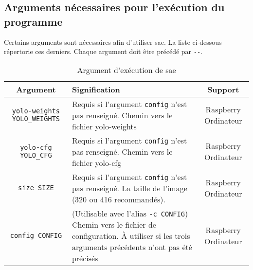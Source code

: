 \subsection{Arguments nécessaires pour l'exécution du programme}
\label{sec:executionArg_clearWay}
Certains arguments sont nécessaires afin d'utiliser \gls{sae}. La liste ci-dessous répertorie ces derniers.
Chaque argument doit être précédé par \verb=--=.
\begin{table}[H]
    \centering
    \begin{tabularx}{\linewidth}{|c|X|c|}
        \hline
        \rowcolor{tableColorDark} Argument & Signification                                                                                                                                           & Support              \\
        \hline
        \verb=yolo-weights YOLO_WEIGHTS=   & Requis si l'argument \verb=config= n'est pas renseigné. Chemin vers le fichier yolo-weights                                                             & Raspberry Ordinateur \\\hline
        \verb=yolo-cfg YOLO_CFG=           & Requis si l'argument \verb=config= n'est pas renseigné. Chemin vers le fichier yolo-cfg                                                                 & Raspberry Ordinateur \\\hline
        \verb=size SIZE=                   & Requis si l'argument \verb=config= n'est pas renseigné. La taille de l'image (320 ou 416 recommandés).                                                  & Raspberry Ordinateur \\\hline
        \verb=config CONFIG=               & (Utilisable avec l'alias \verb=-c CONFIG=) Chemin vers le fichier de configuration. À utiliser si les trois arguments précédents n'ont pas été précisés & Raspberry Ordinateur \\\hline
    \end{tabularx}
    \label{tab:ArgClearway}
    \caption{Argument d'exécution de \gls{sae}}
\end{table}

